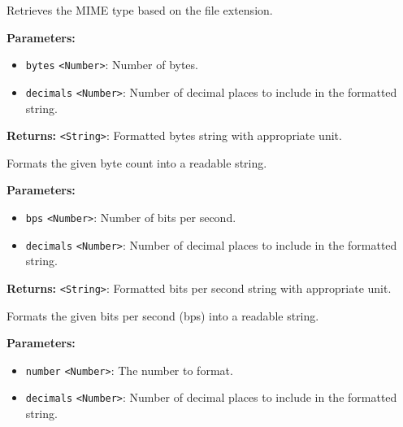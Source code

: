 \documentclass[12pt,a4paper]{article}
\begin{document}
\noindent Retrieves the MIME type based on the file extension.

\vspace{5mm}
\noindent {}


\noindent \textbf{Parameters:}
\begin{itemize}
  \item \texttt{bytes} \texttt{<Number>}: Number of bytes.
  \item \texttt{decimals} \texttt{<Number>}: Number of decimal places to include in the formatted string.
\end{itemize}

\noindent \textbf{Returns:} \texttt{<String>}: Formatted bytes string with appropriate unit.

\noindent Formats the given byte count into a readable string.

\vspace{5mm}
\noindent {}


\noindent \textbf{Parameters:}
\begin{itemize}
  \item \texttt{bps} \texttt{<Number>}: Number of bits per second.
  \item \texttt{decimals} \texttt{<Number>}: Number of decimal places to include in the formatted string.
\end{itemize}

\noindent \textbf{Returns:} \texttt{<String>}: Formatted bits per second string with appropriate unit.

\noindent Formats the given bits per second (bps) into a readable string.

\vspace{5mm}
\noindent {}


\noindent \textbf{Parameters:}
\begin{itemize}
  \item \texttt{number} \texttt{<Number>}: The number to format.
  \item \texttt{decimals} \texttt{<Number>}: Number of decimal places to include in the formatted string.
\end{itemize}
\end{document}
